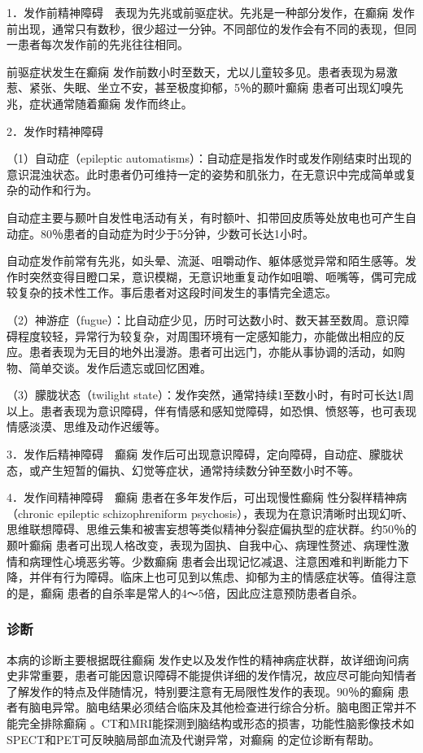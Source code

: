 1．发作前精神障碍　表现为先兆或前驱症状。先兆是一种部分发作，在癫痫
发作前出现，通常只有数秒，很少超过一分钟。不同部位的发作会有不同的表现，但同一患者每次发作前的先兆往往相同。

前驱症状发生在癫痫
发作前数小时至数天，尤以儿童较多见。患者表现为易激惹、紧张、失眠、坐立不安，甚至极度抑郁，5％的颞叶癫痫
患者可出现幻嗅先兆，症状通常随着癫痫
发作而终止。

2．发作时精神障碍

（1）自动症（epileptic
automatisms）：自动症是指发作时或发作刚结束时出现的意识混浊状态。此时患者仍可维持一定的姿势和肌张力，在无意识中完成简单或复杂的动作和行为。

自动症主要与颞叶自发性电活动有关，有时额叶、扣带回皮质等处放电也可产生自动症。80％患者的自动症为时少于5分钟，少数可长达1小时。

自动症发作前常有先兆，如头晕、流涎、咀嚼动作、躯体感觉异常和陌生感等。发作时突然变得目瞪口呆，意识模糊，无意识地重复动作如咀嚼、咂嘴等，偶可完成较复杂的技术性工作。事后患者对这段时间发生的事情完全遗忘。

（2）神游症（fugue）：比自动症少见，历时可达数小时、数天甚至数周。意识障碍程度较轻，异常行为较复杂，对周围环境有一定感知能力，亦能做出相应的反应。患者表现为无目的地外出漫游。患者可出远门，亦能从事协调的活动，如购物、简单交谈。发作后遗忘或回忆困难。

（3）朦胧状态（twilight
state）：发作突然，通常持续1至数小时，有时可长达1周以上。患者表现为意识障碍，伴有情感和感知觉障碍，如恐惧、愤怒等，也可表现情感淡漠、思维及动作迟缓等。

3．发作后精神障碍　癫痫
发作后可出现意识障碍，定向障碍，自动症、朦胧状态，或产生短暂的偏执、幻觉等症状，通常持续数分钟至数小时不等。

4．发作间精神障碍　癫痫
患者在多年发作后，可出现慢性癫痫
性分裂样精神病（chronic epileptic schizophreniform
psychosis），表现为在意识清晰时出现幻听、思维联想障碍、思维云集和被害妄想等类似精神分裂症偏执型的症状群。约50％的颞叶癫痫
患者可出现人格改变，表现为固执、自我中心、病理性赘述、病理性激情和病理性心境恶劣等。少数癫痫
患者会出现记忆减退、注意困难和判断能力下降，并伴有行为障碍。临床上也可见到以焦虑、抑郁为主的情感症状等。值得注意的是，癫痫
患者的自杀率是常人的4～5倍，因此应注意预防患者自杀。

\subsubsection{诊断}

本病的诊断主要根据既往癫痫
发作史以及发作性的精神病症状群，故详细询问病史非常重要，患者可能因意识障碍不能提供详细的发作情况，故应尽可能向知情者了解发作的特点及伴随情况，特别要注意有无局限性发作的表现。90％的癫痫
患者有脑电异常。脑电结果必须结合临床及其他检查进行综合分析。脑电图正常并不能完全排除癫痫
。CT和MRI能探测到脑结构或形态的损害，功能性脑影像技术如SPECT和PET可反映脑局部血流及代谢异常，对癫痫
的定位诊断有帮助。

